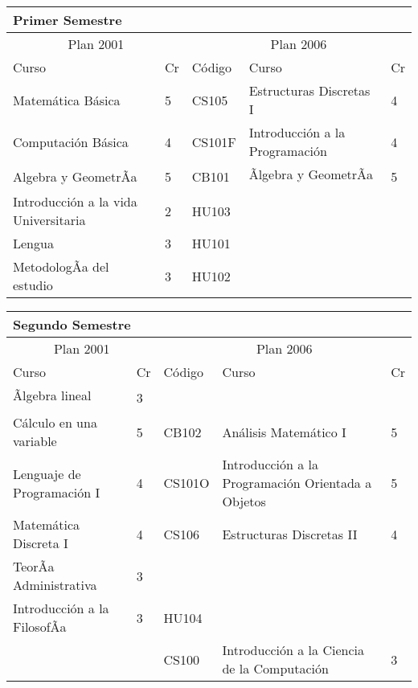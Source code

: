 \begin{center}
\begin{tabularx}{0.95\textwidth}{|p{4cm}|p{1cm}||p{2cm}|X|p{1cm}|}\hline
\multicolumn{5}{|l|}{\textbf{Primer Semestre}} \\ \hline
\multicolumn{2}{|c|}{Plan 2001} & \multicolumn{3}{|c|}{Plan 2006} \\ \hline
Curso & Cr & Código & Curso & Cr \\ \hline
Matemática Básica & 5 & CS105 & Estructuras Discretas I & 4 \\ \hline
Computación Básica & 4 & CS101F & Introducción a la Programación & 4 \\ \hline
Algebra y GeometrÃ­a & 5 & CB101 & Ãlgebra y GeometrÃ­a & 5 \\ \hline
Introducción a la vida Universitaria & 2 & HU103 &  & \\ \hline
Lengua & 3 & HU101 &  & \\ \hline
MetodologÃ­a del estudio & 3 & HU102 &  & \\ \hline
\end{tabularx}
\end{center}

\begin{center}
\begin{tabularx}{0.95\textwidth}{|p{4cm}|p{1cm}||p{2cm}|X|p{1cm}|}\hline
\multicolumn{5}{|l|}{\textbf{Segundo Semestre}} \\ \hline
\multicolumn{2}{|c|}{Plan 2001} & \multicolumn{3}{|c|}{Plan 2006} \\ \hline
Curso & Cr & Código & Curso & Cr \\ \hline
Ãlgebra lineal & 3 &  &  & \\ \hline
Cálculo en una variable & 5 & CB102 & Análisis Matemático I & 5 \\ \hline
Lenguaje de Programación I & 4 & CS101O & Introducción a la Programación Orientada a Objetos & 5 \\ \hline
Matemática Discreta I & 4 & CS106 & Estructuras Discretas II & 4 \\ \hline
TeorÃ­a Administrativa & 3 &  &  & \\ \hline
Introducción a la FilosofÃ­a & 3 & HU104 &  & \\ \hline
 &  & CS100 & Introducción a la Ciencia de la Computación & 3 \\ \hline
\end{tabularx}
\end{center}

